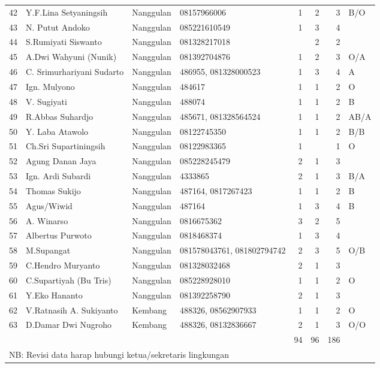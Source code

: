 \begin{longtable}{|r|l|l|p{1.7cm}|r|r|r|p{0.7cm}|}
42	&Y.F.Lina Setyaningsih	&Nanggulan 	&08157966006	&1	&2	&3	&B/O\\
43	&N. Putut Andoko	&Nanggulan 	&085221610549	&1	&3	&4	&\\
44	&S.Rumiyati Siswanto	&Nanggulan 	&081328217018	&	&2	&2	&\\
45	&A.Dwi Wahyuni (Nunik)	&Nanggulan 	&081392704876	&1	&2	&3	&O/A\\
46	&C. Srimurhariyani Sudarto	&Nanggulan 	&486955, 081328000523	&1	&3	&4	&A\\
47	&Ign. Mulyono	&Nanggulan 	&484617	&1	&1	&2	&O\\
48	&V. Sugiyati	&Nanggulan 	&488074	&1	&1	&2	&B\\
49	&R.Abbas Suhardjo	&Nanggulan 	&485671, 081328564524	&1	&1	&2	&AB/A\\
50	&Y. Laba Atawolo	&Nanggulan 	&08122745350	&1	&1	&2	&B/B\\
51	&Ch.Sri Supartiningsih	&Nanggulan 	&08122983365	&1	&	&1	&O\\
52	&Agung Danan Jaya	&Nanggulan 	&085228245479	&2	&1	&3	&\\
53	&Ign. Ardi Subardi	&Nanggulan 	&4333865	&2	&1	&3	&B/A\\
54	&Thomas Sukijo	&Nanggulan 	&487164, 0817267423	&1	&1	&2	&B\\
55	&Agus/Wiwid	&Nanggulan 	&487164	&1	&3	&4	&B\\
56	&A. Winarso	&Nanggulan 	&0816675362	&3	&2	&5	&\\
57	&Albertus Purwoto	&Nanggulan 	&0818468374	&1	&3	&4	&\\
58	&M.Supangat	&Nanggulan 	&081578043761, 081802794742	&2	&3	&5	&O/B\\
59	&C.Hendro Muryanto	&Nanggulan 	&081328032468	&2	&1	&3	&\\
60	&C.Supartiyah (Bu Tris)	&Nanggulan 	&085228928010	&1	&1	&2	&O\\
61	&Y.Eko Hananto	&Nanggulan 	&081392258790	&2	&1	&3	&\\
62	&V.Ratnasih A. Sukiyanto	&Kembang	&488326, 08562907933	&1	&1	&2	&O\\
63	&D.Damar Dwi Nugroho	&Kembang	&488326, 08132836667	&2	&1	&3	&O/O\\ \hline
	&	&	&	&94	&96	&186	&\\ \hline
	\multicolumn{7}{l}{NB: Revisi data harap hubungi ketua/sekretaris lingkungan}\\

\end{longtable}
